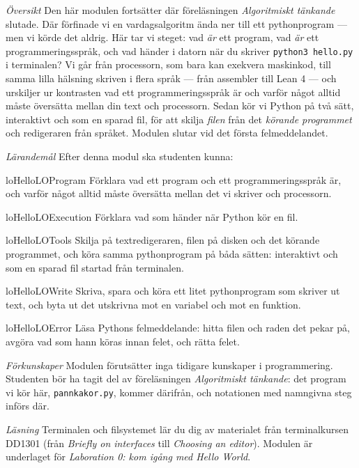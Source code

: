 \emph{Översikt}
Den här modulen fortsätter där föreläsningen \emph{Algoritmiskt tänkande}
slutade.  Där förfinade vi en vardagsalgoritm ända ner till ett
pythonprogram --- men vi körde det aldrig.  Här tar vi steget: vad
\emph{är} ett program, vad \emph{är} ett programmeringsspråk, och vad
händer i datorn när du skriver \texttt{python3 hello.py} i
terminalen?  Vi går från processorn, som bara kan exekvera maskinkod,
till samma lilla hälsning skriven i flera språk --- från assembler till
Lean 4 --- och urskiljer ur kontrasten vad ett programmeringsspråk är och
varför något alltid måste översätta mellan din text och processorn.  Sedan kör
vi Python på två sätt, interaktivt och som en sparad fil, för att skilja
\emph{filen} från det \emph{körande programmet} och redigeraren från
språket.  Modulen slutar vid det första felmeddelandet.

\emph{Lärandemål}
Efter denna modul ska studenten kunna:
\begin{restatable}{lo}{HelloLOProgram}\label{HelloLOProgram}%
  Förklara vad ett program och ett programmeringsspråk är, och varför
  något alltid måste översätta mellan det vi skriver och
  processorn.
\end{restatable}
\begin{restatable}{lo}{HelloLOExecution}\label{HelloLOExecution}%
  Förklara vad som händer när Python kör en fil.
\end{restatable}
\begin{restatable}{lo}{HelloLOTools}\label{HelloLOTools}%
  Skilja på textredigeraren, filen på disken och det körande programmet,
  och köra samma pythonprogram på båda sätten: interaktivt och som en
  sparad fil startad från terminalen.
\end{restatable}
\begin{restatable}{lo}{HelloLOWrite}\label{HelloLOWrite}%
  Skriva, spara och köra ett litet pythonprogram som skriver ut text,
  och byta ut det utskrivna mot en variabel och mot en funktion.
\end{restatable}
\begin{restatable}{lo}{HelloLOError}\label{HelloLOError}%
  Läsa Pythons felmeddelande: hitta filen och raden det pekar på, avgöra
  vad som hann köras innan felet, och rätta felet.
\end{restatable}

\emph{Förkunskaper}
Modulen förutsätter inga tidigare kunskaper i programmering.  Studenten bör
ha tagit del av föreläsningen \emph{Algoritmiskt tänkande}: det program vi
kör här, \texttt{pannkakor.py}, kommer därifrån, och notationen med
namngivna steg införs där.

\emph{Läsning}
Terminalen och filsystemet lär du dig av materialet från
terminalkursen DD1301 (från
\foreignlanguage{english}{\emph{Briefly on interfaces}} till
\foreignlanguage{english}{\emph{Choosing an editor}}).  Modulen är
underlaget för \emph{Laboration 0: kom igång med Hello World}.
